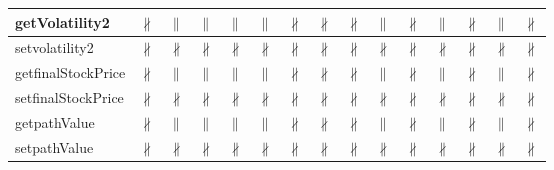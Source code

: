 \documentclass[10pt]{article}
\begin{document}
\begin{longtable}{|l|l|l|l|l|l|l|l|l|l|l|l|l|l|l|}
\hline
getVolatility2&{\color{BrickRed}$\nparallel$}&{\color{blue}$\parallel$}&{\color{blue}$\parallel$}&{\color{blue}$\parallel$}&{\color{blue}$\parallel$}&{\color{BrickRed}$\nparallel$}&{\color{BrickRed}$\nparallel$}&{\color{BrickRed}$\nparallel$}&{\color{blue}$\parallel$}&{\color{BrickRed}$\nparallel$}&{\color{blue}$\parallel$}&{\color{BrickRed}$\nparallel$}&{\color{blue}$\parallel$}&{\color{BrickRed}$\nparallel$}\\
\hline
setvolatility2&{\color{BrickRed}$\nparallel$}&{\color{BrickRed}$\nparallel$}&{\color{BrickRed}$\nparallel$}&{\color{BrickRed}$\nparallel$}&{\color{BrickRed}$\nparallel$}&{\color{BrickRed}$\nparallel$}&{\color{BrickRed}$\nparallel$}&{\color{BrickRed}$\nparallel$}&{\color{BrickRed}$\nparallel$}&{\color{BrickRed}$\nparallel$}&{\color{BrickRed}$\nparallel$}&{\color{BrickRed}$\nparallel$}&{\color{BrickRed}$\nparallel$}&{\color{BrickRed}$\nparallel$}\\
\hline
getfinalStockPrice&{\color{BrickRed}$\nparallel$}&{\color{blue}$\parallel$}&{\color{blue}$\parallel$}&{\color{blue}$\parallel$}&{\color{blue}$\parallel$}&{\color{BrickRed}$\nparallel$}&{\color{BrickRed}$\nparallel$}&{\color{BrickRed}$\nparallel$}&{\color{blue}$\parallel$}&{\color{BrickRed}$\nparallel$}&{\color{blue}$\parallel$}&{\color{BrickRed}$\nparallel$}&{\color{blue}$\parallel$}&{\color{BrickRed}$\nparallel$}\\
\hline
setfinalStockPrice&{\color{BrickRed}$\nparallel$}&{\color{BrickRed}$\nparallel$}&{\color{BrickRed}$\nparallel$}&{\color{BrickRed}$\nparallel$}&{\color{BrickRed}$\nparallel$}&{\color{BrickRed}$\nparallel$}&{\color{BrickRed}$\nparallel$}&{\color{BrickRed}$\nparallel$}&{\color{BrickRed}$\nparallel$}&{\color{BrickRed}$\nparallel$}&{\color{BrickRed}$\nparallel$}&{\color{BrickRed}$\nparallel$}&{\color{BrickRed}$\nparallel$}&{\color{BrickRed}$\nparallel$}\\
\hline
getpathValue&{\color{BrickRed}$\nparallel$}&{\color{blue}$\parallel$}&{\color{blue}$\parallel$}&{\color{blue}$\parallel$}&{\color{blue}$\parallel$}&{\color{BrickRed}$\nparallel$}&{\color{BrickRed}$\nparallel$}&{\color{BrickRed}$\nparallel$}&{\color{blue}$\parallel$}&{\color{BrickRed}$\nparallel$}&{\color{blue}$\parallel$}&{\color{BrickRed}$\nparallel$}&{\color{blue}$\parallel$}&{\color{BrickRed}$\nparallel$}\\
\hline
setpathValue&{\color{BrickRed}$\nparallel$}&{\color{BrickRed}$\nparallel$}&{\color{BrickRed}$\nparallel$}&{\color{BrickRed}$\nparallel$}&{\color{BrickRed}$\nparallel$}&{\color{BrickRed}$\nparallel$}&{\color{BrickRed}$\nparallel$}&{\color{BrickRed}$\nparallel$}&{\color{BrickRed}$\nparallel$}&{\color{BrickRed}$\nparallel$}&{\color{BrickRed}$\nparallel$}&{\color{BrickRed}$\nparallel$}&{\color{BrickRed}$\nparallel$}&{\color{BrickRed}$\nparallel$}\\
\hline
\end{longtable}
\newpage
\end{document}
